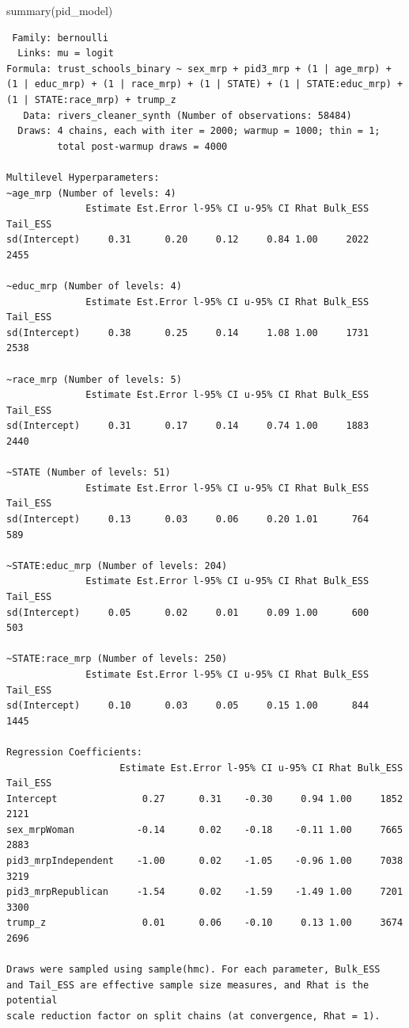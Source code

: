 \documentclass[
  letterpaper,
  DIV=11,
  numbers=noendperiod]{scrartcl}
\newenvironment{Shaded}{\begin{snugshade}}{\end{snugshade}}
\newcommand{\FunctionTok}[1]{\textcolor[rgb]{0.28,0.35,0.67}{#1}}
\newcommand{\NormalTok}[1]{\textcolor[rgb]{0.00,0.23,0.31}{#1}}
\begin{document}
\begin{Shaded}
\begin{Highlighting}[]
\FunctionTok{summary}\NormalTok{(pid\_model)}
\end{Highlighting}
\end{Shaded}

\begin{verbatim}
 Family: bernoulli 
  Links: mu = logit 
Formula: trust_schools_binary ~ sex_mrp + pid3_mrp + (1 | age_mrp) + (1 | educ_mrp) + (1 | race_mrp) + (1 | STATE) + (1 | STATE:educ_mrp) + (1 | STATE:race_mrp) + trump_z 
   Data: rivers_cleaner_synth (Number of observations: 58484) 
  Draws: 4 chains, each with iter = 2000; warmup = 1000; thin = 1;
         total post-warmup draws = 4000

Multilevel Hyperparameters:
~age_mrp (Number of levels: 4) 
              Estimate Est.Error l-95% CI u-95% CI Rhat Bulk_ESS Tail_ESS
sd(Intercept)     0.31      0.20     0.12     0.84 1.00     2022     2455

~educ_mrp (Number of levels: 4) 
              Estimate Est.Error l-95% CI u-95% CI Rhat Bulk_ESS Tail_ESS
sd(Intercept)     0.38      0.25     0.14     1.08 1.00     1731     2538

~race_mrp (Number of levels: 5) 
              Estimate Est.Error l-95% CI u-95% CI Rhat Bulk_ESS Tail_ESS
sd(Intercept)     0.31      0.17     0.14     0.74 1.00     1883     2440

~STATE (Number of levels: 51) 
              Estimate Est.Error l-95% CI u-95% CI Rhat Bulk_ESS Tail_ESS
sd(Intercept)     0.13      0.03     0.06     0.20 1.01      764      589

~STATE:educ_mrp (Number of levels: 204) 
              Estimate Est.Error l-95% CI u-95% CI Rhat Bulk_ESS Tail_ESS
sd(Intercept)     0.05      0.02     0.01     0.09 1.00      600      503

~STATE:race_mrp (Number of levels: 250) 
              Estimate Est.Error l-95% CI u-95% CI Rhat Bulk_ESS Tail_ESS
sd(Intercept)     0.10      0.03     0.05     0.15 1.00      844     1445

Regression Coefficients:
                    Estimate Est.Error l-95% CI u-95% CI Rhat Bulk_ESS Tail_ESS
Intercept               0.27      0.31    -0.30     0.94 1.00     1852     2121
sex_mrpWoman           -0.14      0.02    -0.18    -0.11 1.00     7665     2883
pid3_mrpIndependent    -1.00      0.02    -1.05    -0.96 1.00     7038     3219
pid3_mrpRepublican     -1.54      0.02    -1.59    -1.49 1.00     7201     3300
trump_z                 0.01      0.06    -0.10     0.13 1.00     3674     2696

Draws were sampled using sample(hmc). For each parameter, Bulk_ESS
and Tail_ESS are effective sample size measures, and Rhat is the potential
scale reduction factor on split chains (at convergence, Rhat = 1).
\end{verbatim}
\end{document}
